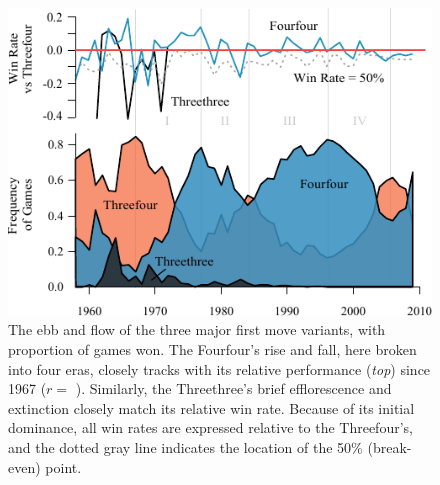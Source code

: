 \documentclass[reqno,12pt]{amsart}
\begin{document}
\begin{figure}[t]
  \begin{center}
    \includegraphics[scale=1.2]{./assets/m1FreqsWins.pdf}
    \caption{The ebb and flow of the three major first move variants, with proportion of games won. The Fourfour's rise and fall, here broken into four eras, closely tracks with its relative performance (\textit{top}) since 1967 ($r=$ \corFourFourFrqWin). Similarly, the Threethree's brief efflorescence and extinction closely match its relative win rate. Because of its initial dominance, all win rates are expressed relative to the Threefour's, and the dotted gray line indicates the location of the 50\% (break-even) point.}
    \label{fig:m1FreqsWins}
  \end{center}
\end{figure}
\end{document}

